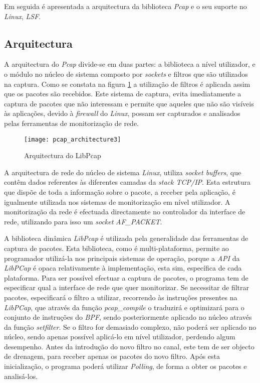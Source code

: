 Em seguida é apresentada a arquitectura da biblioteca \textit{Pcap} e o seu suporte no \textit{Linux}, \textit{LSF}.

\subsection {Arquitectura}
\label{sect:architecture_libpcap}
A arquitectura do \textit{Pcap} divide-se em duas partes: a biblioteca a nível utilizador, e o módulo no núcleo de sistema composto por \textit{sockets} e filtros que são utilizados na captura.
Como se constata na figura \ref{fig:pcap_architecture} a utilização de filtros é aplicada assim que os pacotes são recebidos.
Este sistema de captura, evita imediatamente a captura de pacotes que não interessam e permite que aqueles que não são visíveis às aplicações, devido à \textit{firewall} do \textit{Linux}, possam ser capturados e analisados pelas ferramentas de monitorização de rede.

\begin{figure}[htbp]
       \centering
       \texttt{[image: pcap\_architecture3]}
       \caption{Arquitectura do LibPcap}
      \label{fig:pcap_architecture}
\end{figure}

A arquitectura de rede do núcleo de sistema \textit{Linux}, utiliza \textit{socket buffers}, que contêm dados referentes às diferentes camadas da \textit{stack TCP/IP}.
Esta estrutura que dispõe de toda a informação sobre o pacote, a receber pela aplicação, é igualmente utilizada nos sistemas de monitorização em nível utilizador.
A monitorização da rede é efectuada directamente no controlador da interface de rede, utilizando para isso um \textit{socket} \textit{AF\_PACKET}.

A biblioteca dinâmica \textit{LibPcap} é utilizada pela generalidade das ferramentas de captura de pacotes.
Esta biblioteca, como é multi-plataforma, permite ao programador utilizá-la nos principais sistemas de operação, porque a \textit{API} da \textit{LibPCap} é opaca relativamente à implementação, esta sim, específica de cada plataforma.
Para ser possível efectuar a captura de pacotes, o programa tem de especificar qual a interface de rede que quer monitorizar.
Se necessitar de filtrar pacotes, especificará o filtro a utilizar, recorrendo às instruções presentes na \textit{LibPCap}, que através da função  \textit{pcap_compile} o traduzirá e optimizará para o conjunto de instruções do \textit{BPF}, sendo posteriormente aplicado no núcleo através da função \textit{setfilter}.
Se o filtro for demasiado complexo, não poderá ser aplicado no núcleo, sendo apenas possível aplicá-lo em nível utilizador, perdendo algum desempenho.
Antes da introdução do novo filtro no canal, este tem de ser objecto de drenagem, para receber apenas os pacotes do novo filtro.
Após esta inicialização, o programa poderá utilizar \textit{Polling}, de forma a obter os pacotes e analisá-los.


